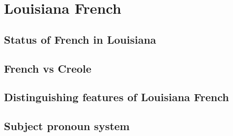   \section{Louisiana French}
    \subsection{Status of French in Louisiana}
    \subsection{French vs Creole}
    \subsection{Distinguishing features of Louisiana French}
    \subsection{Subject pronoun system}
